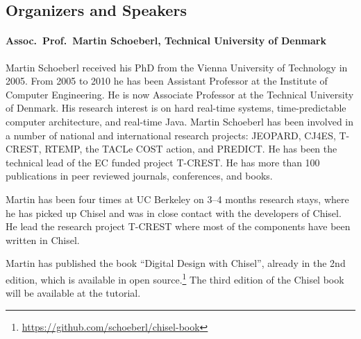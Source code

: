 \documentclass{article}
\begin{document}
\subsection*{Organizers and Speakers}

 
\paragraph{Assoc.~Prof.~Martin Schoeberl, Technical University of Denmark}

Martin Schoeberl received his PhD from the Vienna University of Technology in 2005. From 2005 to 2010 he has been Assistant Professor at the Institute of Computer Engineering. He is now Associate Professor at the Technical University of Denmark. His research interest is on hard real-time systems, time-predictable computer architecture, and real-time Java.  Martin Schoeberl has been involved in a number of national and international research projects: JEOPARD, CJ4ES, T-CREST, RTEMP, the TACLe COST action, and PREDICT.  He has been the technical lead of the EC funded project T-CREST.  He has more than 100 publications in peer reviewed journals, conferences, and books.

Martin has been four times at UC Berkeley on 3--4 months research stays, where he has picked up Chisel and was in close contact with the developers of Chisel. He lead the research project T-CREST where most of the components have been written in Chisel.

Martin has published the book ``Digital Design with Chisel'', already in the 2nd edition,
which is available in open source.\footnote{\url{https://github.com/schoeberl/chisel-book}}
The third edition of the Chisel book will be available at the tutorial.

%
%
\end{document}
